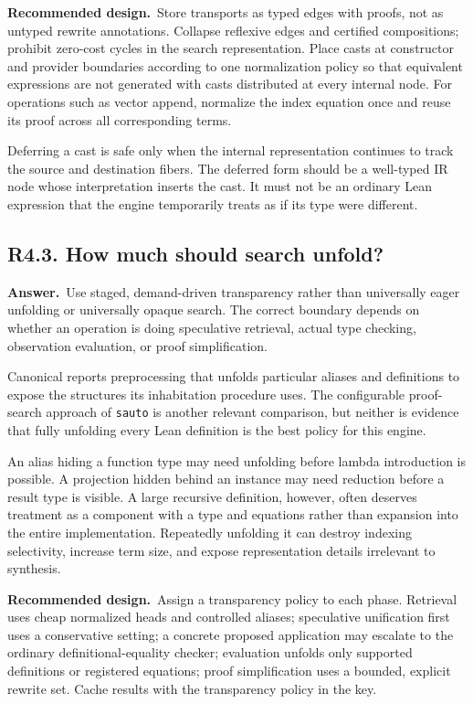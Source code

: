\documentclass[11pt,a4paper]{article}
\newcommand{\code}[1]{\nolinkurl{#1}}
\newcommand{\qid}[3]{\subsection{#2. #3}\label{#1}}
\newcommand{\answer}{\noindent\textbf{Answer.}\ }
\newcommand{\proposal}{\noindent\textbf{Recommended design.}\ }
\theoremstyle{remark}
\begin{document}
\proposal Store transports as typed edges with proofs, not as untyped rewrite annotations. Collapse reflexive edges and certified compositions; prohibit zero-cost cycles in the search representation. Place casts at constructor and provider boundaries according to one normalization policy so that equivalent expressions are not generated with casts distributed at every internal node. For operations such as vector append, normalize the index equation once and reuse its proof across all corresponding terms.

Deferring a cast is safe only when the internal representation continues to track the source and destination fibers. The deferred form should be a well-typed IR node whose interpretation inserts the cast. It must not be an ordinary Lean expression that the engine temporarily treats as if its type were different.

\qid{q43}{R4.3}{How much should search unfold?}
\answer Use staged, demand-driven transparency rather than universally eager unfolding or universally opaque search. The correct boundary depends on whether an operation is doing speculative retrieval, actual type checking, observation evaluation, or proof simplification.

Canonical reports preprocessing that unfolds particular aliases and definitions to expose the structures its inhabitation procedure uses. The configurable proof-search approach of \code{sauto} is another relevant comparison, but neither is evidence that fully unfolding every Lean definition is the best policy for this engine.~\cite{canonical,sauto}

An alias hiding a function type may need unfolding before lambda introduction is possible. A projection hidden behind an instance may need reduction before a result type is visible. A large recursive definition, however, often deserves treatment as a component with a type and equations rather than expansion into the entire implementation. Repeatedly unfolding it can destroy indexing selectivity, increase term size, and expose representation details irrelevant to synthesis.

\proposal Assign a transparency policy to each phase. Retrieval uses cheap normalized heads and controlled aliases; speculative unification first uses a conservative setting; a concrete proposed application may escalate to the ordinary definitional-equality checker; evaluation unfolds only supported definitions or registered equations; proof simplification uses a bounded, explicit rewrite set. Cache results with the transparency policy in the key.
\end{document}
